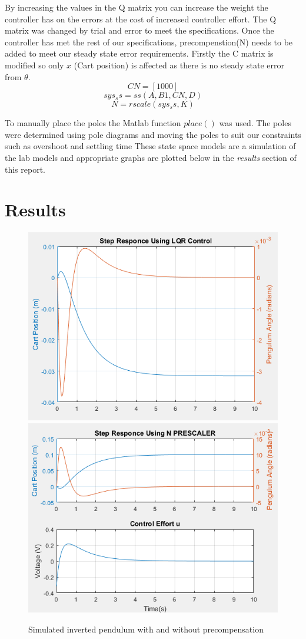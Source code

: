 \documentclass[a4paper,12pt]{article}
\begin{document}
By increasing the values in the Q matrix you can increase the weight the controller has on the errors at the cost of increased controller effort. The Q matrix was changed by trial and error to meet the specifications.
Once the controller has met the rest of our specifications, precompenstion(N) needs to be added to meet our steady state error requirements. Firstly the C matrix is modified so only $x$ (Cart position) is affected as there is no steady state error from $\theta$.$$CN = [1 0 0 0]$$ $$sys_ss = ss(A,B1,CN,D)$$ $$N = rscale(sys_ss,K)$$

To manually place the poles the Matlab function $place()$ was used. The poles were determined using pole diagrams and moving the poles to suit our constraints such as overshoot and settling time These state space models are a simulation of the lab models and appropriate graphs are plotted below in the \emph{results} section of this report.\\

\section{Results}
\begin{figure}[h]
\centering
\includegraphics[scale=0.4]{iP_figure1.png}
\includegraphics[scale=0.4]{iP_figure2.png}
\caption{Simulated inverted pendulum with and without precompensation}
\end{figure}
\end{document}
